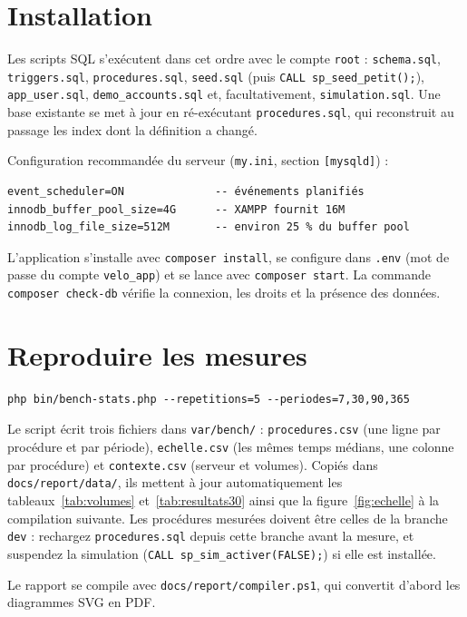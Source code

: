 \section{Installation}\label{ann:installation}

Les scripts SQL s'exécutent dans cet ordre avec le compte \texttt{root} : \texttt{schema.sql}, \texttt{triggers.sql}, \texttt{procedures.sql}, \texttt{seed.sql} (puis \texttt{CALL sp\_seed\_petit();}), \texttt{app\_user.sql}, \texttt{demo\_accounts.sql} et, facultativement, \texttt{simulation.sql}. Une base existante se met à jour en ré-exécutant \texttt{procedures.sql}, qui reconstruit au passage les index dont la définition a changé.

Configuration recommandée du serveur (\texttt{my.ini}, section \texttt{[mysqld]}) :

\begin{lstlisting}[style=sql]
event_scheduler=ON              -- événements planifiés
innodb_buffer_pool_size=4G      -- XAMPP fournit 16M
innodb_log_file_size=512M       -- environ 25 % du buffer pool
\end{lstlisting}

L'application s'installe avec \texttt{composer install}, se configure dans \texttt{.env} (mot de passe du compte \texttt{velo\_app}) et se lance avec \texttt{composer start}. La commande \texttt{composer check-db} vérifie la connexion, les droits et la présence des données.

\section{Reproduire les mesures}\label{ann:mesures}

\begin{lstlisting}[style=sql]
php bin/bench-stats.php --repetitions=5 --periodes=7,30,90,365
\end{lstlisting}

Le script écrit trois fichiers dans \texttt{var/bench/} : \texttt{procedures.csv} (une ligne par procédure et par période), \texttt{echelle.csv} (les mêmes temps médians, une colonne par procédure) et \texttt{contexte.csv} (serveur et volumes). Copiés dans \texttt{docs/report/data/}, ils mettent à jour automatiquement les tableaux~\ref{tab:volumes} et~\ref{tab:resultats30} ainsi que la figure~\ref{fig:echelle} à la compilation suivante. Les procédures mesurées doivent être celles de la branche \texttt{dev} : rechargez \texttt{procedures.sql} depuis cette branche avant la mesure, et suspendez la simulation (\texttt{CALL sp\_sim\_activer(FALSE);}) si elle est installée.

Le rapport se compile avec \texttt{docs/report/compiler.ps1}, qui convertit d'abord les diagrammes SVG en PDF.

